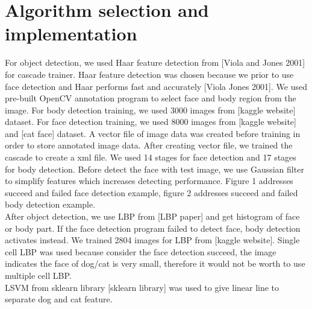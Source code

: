 \documentclass[conference,compsoc]{IEEEtran}
\begin{document}
\section{Algorithm selection and implementation}
For object detection, we used Haar feature detection from [Viola and Jones 2001] for cascade trainer. Haar feature detection was chosen because we prior to use face detection and Haar performs fast and accurately [Viola Jones 2001]. We used pre-built OpenCV annotation program to select face and body region from the image. For body detection training, we used 3000 images from [kaggle website] dataset. For face detection training, we used 8000 images from [kaggle website] and [cat face] dataset. A vector file of image data was created before training in order to store annotated image data. After creating vector file, we trained the cascade to create a xml file. We used 14 stages for face detection and 17 stages for body detection. Before detect the face with test image, we use Gaussian filter to simplify features which increases detecting performance. Figure 1 addresses succeed and failed face detection example, figure 2 addresses succeed and failed body detection example.\\

After object detection, we use LBP from [LBP paper] and get histogram of face or body part. If the face detection program failed to detect face, body detection activates instead. We trained 2804 images for LBP from [kaggle website]. Single cell LBP was used because consider the face detection succeed, the image indicates the face of dog/cat is very small, therefore it would not be worth to use multiple cell LBP.\\

LSVM from sklearn library [sklearn library] was used to give linear line to separate dog and cat feature.
\end{document}
